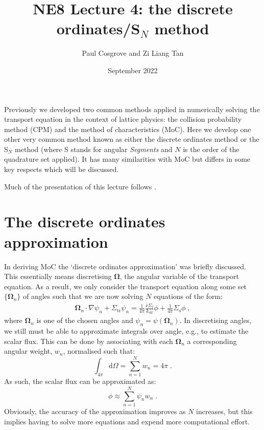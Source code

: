 \documentclass{article}
\title{NE8 Lecture 4: the discrete ordinates/S$_N$ method}
\author{Paul Cosgrove and Zi Liang Tan}
\date{September 2022}
\begin{document}
\maketitle

Previously we developed two common methods applied in numerically solving the transport equation in the context of lattice physics: the collision probability method (CPM) and the method of characteristics (MoC). Here we develop one other very common method known as either the discrete ordinates method or the S$_N$ method (where S stands for angular \textit{Segments} and $N$ is the order of the quadrature set applied). It has many similarities with MoC but differs in some key respects which will be discussed.

Much of the presentation of this lecture follows \cite{Hebert}.

\section{The discrete ordinates approximation}

In deriving MoC the `discrete ordinates approximation' was briefly discussed. This essentially means discretising $\mathbf{\Omega}$, the angular variable of the transport equation. As a result, we only consider the transport equation along some set $\{\mathbf{\Omega}_n\}$ of angles such that we are now solving $N$ equations of the form:
\begin{equation}\label{eq:transport_DO}
    \begin{split}
 \mathbf{\Omega}_n\cdot\nabla\psi_n + \Sigma_\mathrm{tr}\psi_n
    =\frac{1}{4\pi}\frac{\bar{\nu}\Sigma_\mathrm{f}}{ k_\mathrm{eff}}\phi + \frac{1}{4\pi}\Sigma_\mathrm{s}\phi\;\mathrm{,}
    \end{split}
\end{equation}
where $\mathbf{\Omega}_n$ is one of the chosen angles and $\psi_n =\psi(\mathbf{\Omega}_n)$. In discretising angles, we still must be able to approximate integrals over angle, e.g., to estimate the scalar flux. This can be done by associating with each $\mathbf{\Omega}_n$ a corresponding angular weight, $w_n$, normalised such that:
\begin{equation}\label{eq:quad}
	\int_{4\pi}\mathrm{d}\Omega = \sum_{n=1}^{N}w_n = 4\pi\;\mathrm{.}
\end{equation}
As such, the scalar flux can be approximated as:
\begin{equation}
	\phi\approx\sum^N_{n=1}\psi_n w_n\;\mathrm{.}
\end{equation}
Obviously, the accuracy of the approximation improves as $N$ increases, but this implies having to solve more equations and expend more computational effort.
\end{document}
